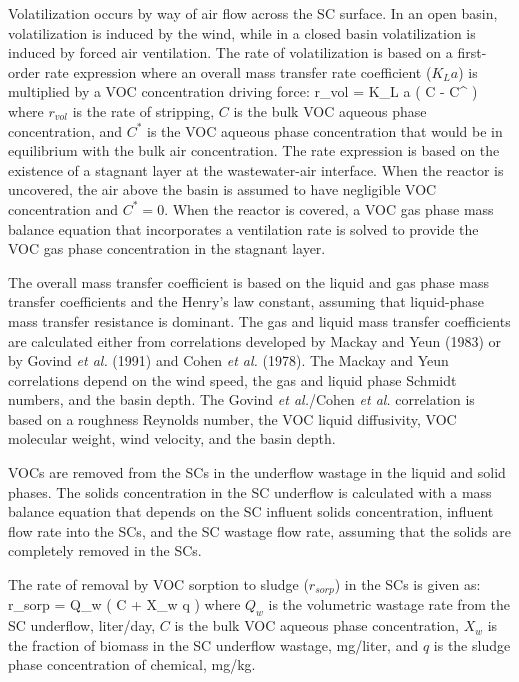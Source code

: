 
Volatilization occurs by way of air flow across the SC surface. In an open
basin, volatilization is induced by the wind, while in a closed basin
volatilization is induced by forced air ventilation.  The rate of
volatilization is based on a first-order rate expression where an overall mass
transfer rate coefficient ($K_L a$) is multiplied by a VOC concentration
driving force:
\mb
r_{vol} = K_L a ( C - C^{\ast} )
\mef
where $r_{vol}$ is the rate of stripping, $C$ is the bulk VOC aqueous phase
concentration, and $C^{\ast}$ is the VOC aqueous phase concentration that would
be in equilibrium with the bulk air concentration.  The rate expression is
based on the existence of a stagnant layer at the wastewater-air interface.
When the reactor is uncovered, the air above the basin is assumed to have
negligible VOC concentration and $C^{\ast} = 0$.  When the reactor is covered,
a VOC gas phase mass balance equation that incorporates a ventilation rate is
solved to provide the VOC gas phase concentration in the stagnant layer.  

The overall mass transfer coefficient is based on the liquid and gas phase mass
transfer coefficients and the Henry's law constant, assuming that liquid-phase
mass transfer resistance is dominant.  The gas and liquid mass transfer
coefficients are calculated either from correlations developed by Mackay and
Yeun (1983) or by Govind {\it et al.} (1991) and Cohen {\it et al.} (1978).
The Mackay and Yeun correlations depend on the wind speed, the gas and liquid
phase Schmidt numbers, and the basin depth.  The Govind {\it et al.}/Cohen {\it
et al.} correlation is based on a roughness Reynolds number, the VOC liquid
diffusivity, VOC molecular weight, wind velocity, and the basin depth.


VOCs are removed from the SCs in the underflow wastage in the liquid and solid
phases.  The solids concentration in the SC underflow is calculated with a mass
balance equation that depends on the SC influent solids concentration, influent
flow rate into the SCs, and the SC wastage flow rate, assuming that the solids
are completely removed in the SCs. 

The rate of removal by VOC sorption to sludge ($r_{sorp}$) in the SCs is given
as:
\mb
r_{sorp} = Q_w ( C + X_w q )
\mef
where $Q_w$ is the volumetric wastage rate from the SC underflow,
liter/day, $C$ is the bulk VOC aqueous phase concentration, $X_w$ is
the fraction of biomass in the SC underflow wastage, mg/liter, and $q$
is the sludge phase concentration of chemical, mg/kg.

